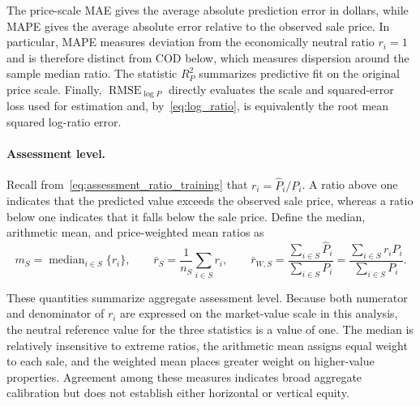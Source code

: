 \documentclass[10pt]{article}
\theoremstyle{definition}
\newcommand{\1}{\mathbf{1}}
\begin{document}
{The price-scale MAE gives the average absolute prediction error in dollars, while MAPE gives the average absolute error relative to the observed sale price. In particular, MAPE measures deviation from the economically neutral ratio $r_i=1$ and is therefore distinct from COD below, which measures dispersion around the sample median ratio. The statistic $R^2_P$ summarizes predictive fit on the original price scale. Finally, $\operatorname{RMSE}_{\log P}$ directly evaluates the scale and squared-error loss used for estimation and, by~\eqref{eq:log_ratio}, is equivalently the root mean squared log-ratio error.}
\textcolor{impGreen}{}

\paragraph{Assessment level.}
Recall from~\eqref{eq:assessment_ratio_training} that $r_i=\widehat P_i/P_i$. A ratio above one indicates that the predicted value exceeds the observed sale price, whereas a ratio below one indicates that it falls below the sale price. Define the median, arithmetic mean, and price-weighted mean ratios as
\begin{equation}
\label{eq:level_ratios}
m_S
=
\operatorname{median}_{i\in S}\{r_i\},
\qquad
\bar r_S
=
\frac{1}{n_S}\sum_{i\in S}r_i,
\qquad
\bar r_{W,S}
=
\frac{\sum_{i\in S}\widehat P_i}{\sum_{i\in S}P_i}
=
\frac{\sum_{i\in S}r_iP_i}{\sum_{i\in S}P_i}.
\end{equation}

These quantities summarize aggregate assessment level. Because both numerator and denominator of $r_i$ are expressed on the market-value scale in this analysis, the neutral reference value for the three statistics is a value of one. The median is relatively insensitive to extreme ratios, the arithmetic mean assigns equal weight to each sale, and the weighted mean places greater weight on higher-value properties. Agreement among these measures indicates broad aggregate calibration but does not establish either horizontal or vertical equity.
\end{document}
